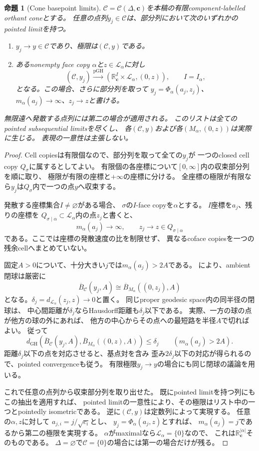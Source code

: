 \documentclass[11pt,a4paper]{ltjsarticle}
\newcommand{\RR}{\mathbb R}
\newcommand{\GH}{\operatorname{GH}}
\newcommand{\pGH}{\operatorname{pGH}}
\newcommand{\cC}{\mathcal C}
\newcommand{\ov}{\overline}
\theoremstyle{plain}
\newtheorem{proposition}[proposition]{命題}
\theoremstyle{definition}
\theoremstyle{remark}
\begin{document}
\begin{proposition}[Cone basepoint limits]
\label{prop:cone-limits}
$\cC=\cC(\Delta,\bm c)$を本稿の有限component-labelled orthant coneとする。
任意の点列$y_j\in\cC$は、部分列において次のいずれかのpointed limitを持つ。
\begin{enumerate}
 \item $y_j\to y\in\cC$であり、極限は$(\cC,y)$である。
 \item あるnonempty face copy $\alpha$と$z\in\mathcal L_\alpha$に対し
 \[
  (\cC,y_j)\xrightarrow{\pGH}
  (\RR^I_{\bm c}\times\mathcal L_\alpha,(0,z)),
  \qquad I=I_\alpha,
 \]
  となる。この場合、さらに部分列を取って
  $y_j=\Phi_\alpha(a_j,z_j)$、
  $m_\alpha(a_j)\to\infty$、$z_j\to z$と書ける。
\end{enumerate}
無限遠へ発散する点列には第二の場合が適用される。
このリストは全てのpointed subsequential limitsを尽くし、
各$(\cC,y)$および各$(M_\alpha,(0,z))$は実際に生じる。
表現の一意性は主張しない。
\end{proposition}
\begin{proof}
Cell copiesは有限個なので、部分列を取って全ての$y_j$が
一つのclosed cell copy $Q_\sigma$に属するとしてよい。
有限個の各座標について$[0,\infty]$内の収束部分列を順に取り、
極限が有限の座標と$+\infty$の座標に分ける。
全座標の極限が有限なら$y_j$は$Q_\sigma$内で一つの点$y$へ収束する。

発散する座標集合$I\ne\varnothing$がある場合、
$\sigma$の$I$-face copyを$\alpha$とする。
$I$座標を$a_j$、残りの座標を
$Q_{\sigma\mid\alpha}\subset\mathcal L_\alpha$内の点$z_j$と書くと、
\[
 m_\alpha(a_j)\to\infty,
 \qquad z_j\to z\in Q_{\sigma\mid\alpha}
\]
である。ここでは座標の発散速度の比を制限せず、
異なるcoface copiesを一つの残余cellへまとめていない。

固定$A>0$について、十分大きい$j$では$m_\alpha(a_j)>2A$である。
により、ambient閉球は厳密に
\[
 \ov B_\cC(y_j,A)
 \cong
 \ov B_{M_\alpha}((0,z_j),A)
\]
となる。$\delta_j=d_{\mathcal L_\alpha}(z_j,z)\to0$と置く。
同じproper geodesic space内の同半径の閉球は、
中心間距離が$\delta_j$ならHausdorff距離も$\delta_j$以下である。
実際、一方の球の点が他方の球の外にあれば、
他方の中心からその点への最短路を半径$A$で切ればよい。
従って
\begin{equation}
\label{eq:cone-moving-ball-bound}
 d_{\GH}\!\left(
 \ov B_\cC(y_j,A),
 \ov B_{M_\alpha}((0,z),A)
 \right)\le\delta_j
 \qquad(m_\alpha(a_j)>2A).
\end{equation}
距離$\delta_j$以下の点を対応させると、基点対を含み
歪み$2\delta_j$以下の対応が得られるので、pointed convergenceも従う。
有限極限$y_j\to y$の場合にも同じ閉球の議論を用いる。

これで任意の点列から収束部分列を取り出せた。
既にpointed limitを持つ列にもこの抽出を適用すれば、
pointed limitの一意性により、その極限はリスト中の一つとpointedly isometricである。
逆に$(\cC,y)$は定数列によって実現する。
任意の$\alpha,z$に対して
$a_{j,i}=j/\sqrt{c_i}$とし、
$y_j=\Phi_\alpha(a_j,z)$とすれば、
$m_\alpha(a_j)=j$であるから第二の極限を実現する。
$\alpha$がmaximalなら$\mathcal L_\alpha=\{0\}$なので、
これは$\RR^{|\alpha|}_{\bm c}$そのものである。
$\Delta=\varnothing$で$\cC=\{0\}$の場合には第一の場合だけが残る。
\end{proof}
\end{document}
